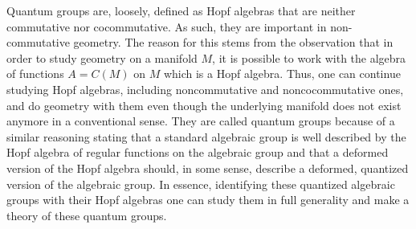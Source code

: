 Quantum groups are, loosely, defined as Hopf algebras that are neither commutative nor
cocommutative. As such, they are important in non-commutative geometry. The reason for
this stems from the observation that in order to study geometry on a manifold $M$,
it is possible to work with the algebra of functions $A = C(M)$ on $M$ which is a Hopf
algebra. Thus, one can continue studying Hopf algebras, including noncommutative
and noncocommutative ones, and do geometry with them even though the underlying manifold
does not exist anymore in a conventional sense. They are called quantum groups because of
a similar reasoning stating that a standard algebraic group is well described by the
Hopf algebra of regular functions on the algebraic group and that a deformed version
of the Hopf algebra should, in some sense, describe a deformed, quantized version of the
algebraic group. In essence, identifying these quantized algebraic groups with their
Hopf algebras one can study them in full generality and make a theory of these quantum
groups.

